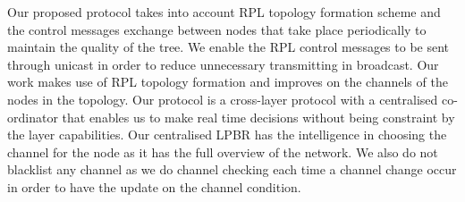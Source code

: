 Our proposed protocol takes into account RPL topology formation scheme and the control messages exchange between nodes that take place periodically to maintain the quality of the tree. We enable the RPL control messages to be sent through unicast in order to reduce unnecessary transmitting in broadcast. Our work makes use of RPL topology formation and improves on the channels of the nodes in the topology. Our protocol is a cross-layer protocol with a centralised co-ordinator that enables us to make real time decisions without being constraint by the layer capabilities. Our centralised LPBR has the intelligence in choosing the channel for the node as it has the full overview of the network. We also do not blacklist any channel as we do channel checking each time a channel change occur in order to have the update on the channel condition.


